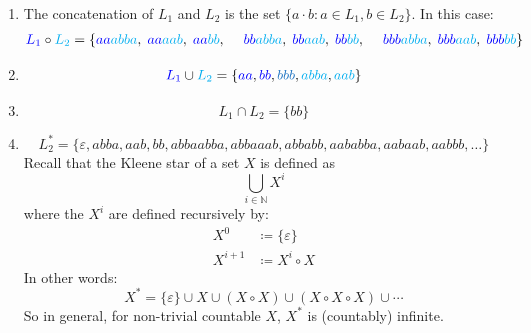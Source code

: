 \documentclass{article}
\theoremstyle{definition}
\theoremstyle{definition}
\theoremstyle{remark}
\begin{document}
\begin{enumerate}
    \item[$(i)$] The concatenation of $L_1$ and $L_2$ is the set $\{a\cdot b :a\in L_1,b\in L_2\}$. In this case:
    \begin{align*}
        \textcolor{blue}{L_1}\circ\textcolor{cyan}{L_2}=\{\textcolor{blue}{aa}\textcolor{cyan}{abba},\;\textcolor{blue}{aa}\textcolor{cyan}{aab},\;\textcolor{blue}{aa}\textcolor{cyan}{bb},\;\quad\textcolor{blue}{bb}\textcolor{cyan}{abba},\;\textcolor{blue}{bb}\textcolor{cyan}{aab},\;\textcolor{blue}{bb}\textcolor{cyan}{bb},\;\quad\textcolor{blue}{bbb}\textcolor{cyan}{abba},\;\textcolor{blue}{bbb}\textcolor{cyan}{aab},\;\textcolor{blue}{bbb}\textcolor{cyan}{bb}\}
    \end{align*}
    
    \item[$(ii)$]
    \begin{equation*}
        \textcolor{blue}{L_1}\cup\textcolor{cyan}{L_2}=\{\textcolor{blue}{aa},\textcolor{blue}{bb},\textcolor{cyan!50!blue}{bbb},\textcolor{cyan}{abba},\textcolor{cyan}{aab}\}
    \end{equation*}

    \item[$(iii)$]
    \begin{equation*}
        L_1\cap L_2=\{bb\}
    \end{equation*}

    \item[$(iv)$]
    \begin{equation*}
        L_2^\ast=\{\varepsilon,abba,aab,bb,abbaabba,abbaaab,abbabb,aababba,aabaab,aabbb,\ldots\}
    \end{equation*}
    Recall that the Kleene star of a set $X$ is defined as 
    \begin{equation*}
        \bigcup_{i\in\mathbb{N}}X^i
    \end{equation*}
    where the $X^i$ are defined recursively by:
    \begin{align*}
        X^0&\coloneqq\{\varepsilon\}\\
        X^{i+1}&\coloneqq X^i\circ X
    \end{align*}
    In other words:
    \begin{equation*}
        X^\ast=\{\varepsilon\}\cup X\cup (X\circ X)\cup (X\circ X\circ X)\cup\cdots
    \end{equation*}
    So in general, for non-trivial countable $X$, $X^\ast$ is (countably) infinite.
\end{enumerate}
\end{document}
